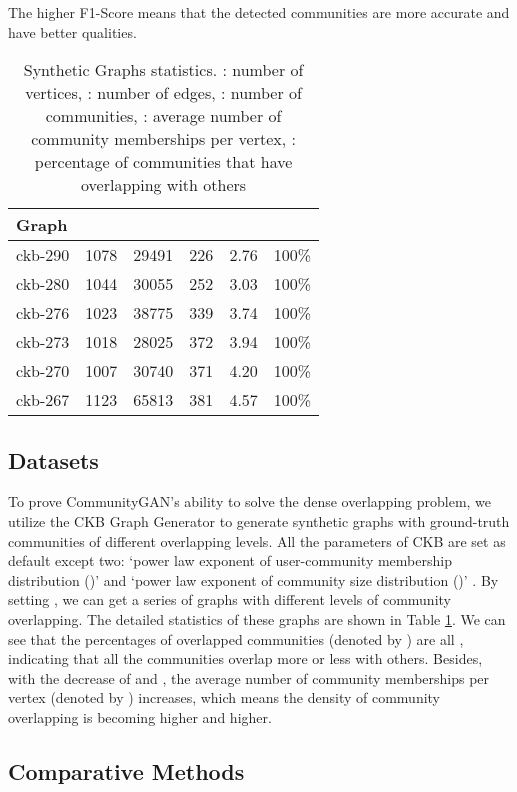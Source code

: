 \documentclass[sigconf]{acmart}
\newcommand{\ComGAN}{CommunityGAN}
\begin{document}
The higher F1-Score means that the detected communities are more accurate and have better qualities.

\begin{table}[tbp]
\centering
\caption{Synthetic Graphs statistics. : number of vertices, : number of edges, : number of communities, : average number of community memberships per vertex, : percentage of communities that have overlapping with others}
\label{tab:synthetic-dataset-statistics}
\begin{tabular}{l||r|r|r|r|r}
Graph   &   &    &  &   &    \\
\hline
\hline
ckb-290 & 1078 & 29491 & 226 & 2.76 & 100\% \\
ckb-280 & 1044 & 30055 & 252 & 3.03 & 100\% \\
ckb-276 & 1023 & 38775 & 339 & 3.74 & 100\% \\
ckb-273 & 1018 & 28025 & 372 & 3.94 & 100\% \\
ckb-270 & 1007 & 30740 & 371 & 4.20 & 100\% \\
ckb-267 & 1123 & 65813 & 381 & 4.57 & 100\% 
\end{tabular}
\end{table}

\subsection{Datasets}
To prove \ComGAN's ability to solve the dense overlapping problem, we utilize the CKB Graph Generator to generate synthetic graphs with ground-truth communities of different overlapping levels.
All the parameters of CKB are set as default except two: `power law exponent of user-community membership distribution ()' and `power law exponent of community size distribution ()' \cite{ckb-benchmark}.
By setting , we can get a series of graphs with different levels of community overlapping.
The detailed statistics of these graphs are shown in Table \ref{tab:synthetic-dataset-statistics}.
We can see that the percentages of overlapped communities (denoted by ) are all , indicating that all the communities overlap more or less with others.
Besides, with the decrease of  and , the average number of community memberships per vertex (denoted by ) increases, which means the density of community overlapping is becoming higher and higher.

\subsection{Comparative Methods}
\end{document}
